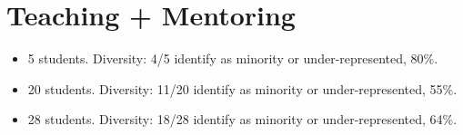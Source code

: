 \documentclass[letterpaper]{deedy-resume} %
\begin{document}
{%

%
%
%
%
%
%
%  
%  
%
%
%
%
%


\section{Teaching + Mentoring}

\vspace{0.2cm}

\begin{itemize}

\item {{} 5 students. Diversity: 4/5 identify as minority or under-represented, 80\%.}

\item {{} 20 students. Diversity: 11/20 identify as minority or under-represented, 55\%.}

\item {{} 28 students. Diversity: 18/28 identify as minority or under-represented, 64\%.}


\end{itemize}}
\end{document}

